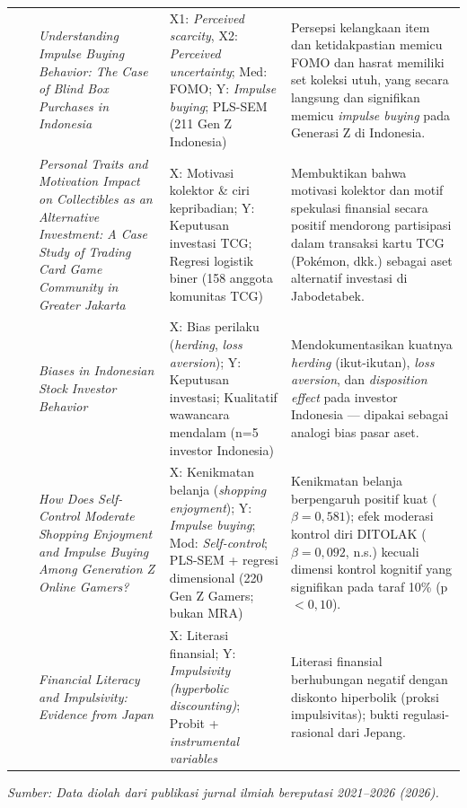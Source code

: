 \documentclass[12pt,a4paper]{article}
\numberwithin{equation}{section}
\numberwithin{table}{section}
\numberwithin{figure}{section}
\begin{document}
\begin{longtable}{>{\centering\arraybackslash}p{0.5cm} >{\raggedright\arraybackslash}p{2.3cm} >{\raggedright\arraybackslash}p{3.2cm} >{\raggedright\arraybackslash}p{2.6cm} >{\raggedright\arraybackslash}p{3.9cm}}
\addlinespace[4pt]
6 & \citet{dewi2026understanding} & \emph{Understanding Impulse Buying Behavior: The Case of Blind Box Purchases in Indonesia} & X1: \emph{Perceived scarcity}, X2: \emph{Perceived uncertainty}; Med: FOMO; Y: \emph{Impulse buying}; PLS-SEM (211 Gen Z Indonesia) & Persepsi kelangkaan item dan ketidakpastian memicu FOMO dan hasrat memiliki set koleksi utuh, yang secara langsung dan signifikan memicu \emph{impulse buying} pada Generasi Z di Indonesia. \\
\addlinespace[4pt]
7 & \citet{aryadi2024personal} & \emph{Personal Traits and Motivation Impact on Collectibles as an Alternative Investment: A Case Study of Trading Card Game Community in Greater Jakarta} & X: Motivasi kolektor \& ciri kepribadian; Y: Keputusan investasi TCG; Regresi logistik biner (158 anggota komunitas TCG) & Membuktikan bahwa motivasi kolektor dan motif spekulasi finansial secara positif mendorong partisipasi dalam transaksi kartu TCG (Pok\'emon, dkk.) sebagai aset alternatif investasi di Jabodetabek. \\
\addlinespace[4pt]
8 & \citet{colline2024biases} & \emph{Biases in Indonesian Stock Investor Behavior} & X: Bias perilaku (\emph{herding}, \emph{loss aversion}); Y: Keputusan investasi; Kualitatif wawancara mendalam (n=5 investor Indonesia) & Mendokumentasikan kuatnya \emph{herding} (ikut-ikutan), \emph{loss aversion}, dan \emph{disposition effect} pada investor Indonesia — dipakai sebagai analogi bias pasar aset. \\
\addlinespace[4pt]
9 & \citet{artadita2024how} & \emph{How Does Self-Control Moderate Shopping Enjoyment and Impulse Buying Among Generation Z Online Gamers?} & X: Kenikmatan belanja (\emph{shopping enjoyment}); Y: \emph{Impulse buying}; Mod: \emph{Self-control}; PLS-SEM + regresi dimensional (220 Gen Z Gamers; bukan MRA) & Kenikmatan belanja berpengaruh positif kuat ($\beta=0{,}581$); efek moderasi kontrol diri DITOLAK ($\beta=0{,}092$, n.s.) kecuali dimensi kontrol kognitif yang signifikan pada taraf 10\% (p$<0{,}10$). \\
\addlinespace[4pt]
10 & \citet{katauke2023financial} & \emph{Financial Literacy and Impulsivity: Evidence from Japan} & X: Literasi finansial; Y: \emph{Impulsivity (hyperbolic discounting)}; Probit + \emph{instrumental variables} & Literasi finansial berhubungan negatif dengan diskonto hiperbolik (proksi impulsivitas); bukti regulasi-rasional dari Jepang. \\
\end{longtable}
\vspace{-0.3cm}
\begin{flushleft}
  \footnotesize\textit{Sumber: Data diolah dari publikasi jurnal ilmiah bereputasi 2021--2026 (2026).}
\end{flushleft}
\endgroup
\end{document}
